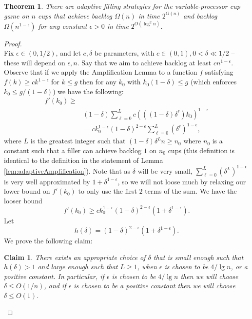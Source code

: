 \documentclass[twocolumn]{article}[10pt]
\newtheorem{clm}{Claim}
\newtheorem{theorem}{Theorem}
\begin{document}
\begin{theorem}
  \label{thm:adaptivePoly}
  There are adaptive filling strategies for the variable-processor cup game on
  $n$ cups that achieve backlog $\Omega(n)$ in time $2^{O(n)}$ and backlog
  $\Omega(n^{1-\epsilon})$ for any constant $\epsilon > 0$ in time $2^{O(\log^2 n)}$.
\end{theorem}
\begin{proof}$ $\\
  Fix $\epsilon \in (0,1/2)$, and let $c, \delta$ be parameters, with $c\in
  (0,1), 0 < \delta \ll 1/2$ -- these will depend on $\epsilon, n$.
  Say that we aim to achieve backlog at least $cn^{1-\epsilon}$.
  Observe that if we apply the Amplification Lemma to a function $f$ satisfying
  $f(k) \ge ck^{1-\epsilon}$ for $k \le g$ then for any $k_0$ with
  $k_0(1-\delta)\le g$ (which enforces $k_0 \le g/ (1-\delta)$) we have the
  following:
  \begin{align*}
  f'(k_0)\ge&\\
  &(1-\delta)\sum_{\ell=0}^L c (((1-\delta)\delta^\ell)k_0)^{1-\epsilon}\\
  &= ck_0^{1-\epsilon} (1-\delta)^{2-\epsilon} \sum_{\ell=0}^L (\delta^\ell)^{1-\epsilon},
  \end{align*}
  where $L$ is the greatest integer such that $(1-\delta)\delta^Ln \ge n_0$
  where $n_0$ is a constant such that a filler can achieve backlog $1$ on $n_0$ cups
  (this definition is identical to the definition in the statement of Lemma
  \ref{lem:adaptiveAmplification}).
  Note that as $\delta$ will be very small, $\sum_{\ell=0}^L
  (\delta^L)^{1-\epsilon}$ is very well approximated by
  $1+\delta^{1-\epsilon}$, so we will not loose much by relaxing our lower
  bound on $f'(k_0)$ to only use the first $2$ terms of the sum. We have the looser bound
  $$f'(k_0) \ge ck_0^{1-\epsilon}(1-\delta)^{2-\epsilon}(1+\delta^{1-\epsilon}).$$
  Let 
  $$h(\delta) = (1-\delta)^{2-\epsilon}(1+\delta^{1-\epsilon}).$$
  We prove the following claim:

  \begin{clm}
    \label{clm:validchoices}
    There exists an appropriate choice of $\delta$ that is small enough such
    that $h(\delta) >1$ and large enough such that $L \ge 1$, when $\epsilon$
    is chosen to be $4/\lg n$, or a positive constant. In particular, if
    $\epsilon$ is chosen to be $4/\lg n$ then we will choose $\delta \le
    O(1/n)$, and if $\epsilon$ is chosen to be a positive constant then we will
    choose $\delta \le O(1)$.
  \end{clm}


\end{proof}
\end{document}
